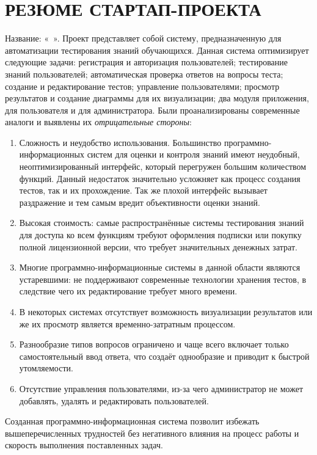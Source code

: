 \section*{РЕЗЮМЕ СТАРТАП-ПРОЕКТА}
Название: «\ ». Проект представляет собой систему, предназначенную  для автоматизации тестирования знаний обучающихся. Данная система оптимизирует следующие задачи: регистрация и авторизация пользователей; тестирование знаний пользователей; автоматическая проверка ответов на вопросы теста; создание и редактирование тестов; управление пользователями; просмотр результатов и создание диаграммы для их визуализации; два модуля приложения, для пользователя и для администратора. Были проанализированы современные аналоги и выявлены их \textit{отрицательные стороны}:
\begin{enumerate}
	\item Сложность и неудобство использования. Большинство программно-информационных систем для оценки и контроля знаний имеют неудобный, неоптимизированный интерфейс, который перегружен большим количеством функций. Данный недостаток значительно усложняет как процесс создания тестов, так и их прохождение. Так же плохой интерфейс вызывает раздражение и тем самым вредит объективности оценки знаний.
	\item Высокая стоимость: самые распространённые системы тестирования знаний для доступа ко всем функциям требуют оформления подписки или покупку полной лицензионной версии, что требует значительных денежных затрат.
	\item Многие программно-информационные системы в данной области являются устаревшими: не поддерживают современные технологии хранения тестов, в следствие чего их редактирование требует много времени.
	\item В некоторых системах отсутствует возможность визуализации результатов или же их просмотр является временно-затратным процессом.
	\item Разнообразие типов вопросов ограничено и чаще всего включает только самостоятельный ввод ответа, что создаёт однообразие и приводит к быстрой утомляемости.
	\item Отсутствие управления пользователями, из-за чего администратор не может добавлять, удалять и редактировать пользователей.
\end{enumerate} 


Созданная программно-информационная система позволит избежать вышеперечисленных трудностей без негативного влияния на процесс работы и скорость выполнения поставленных задач.

